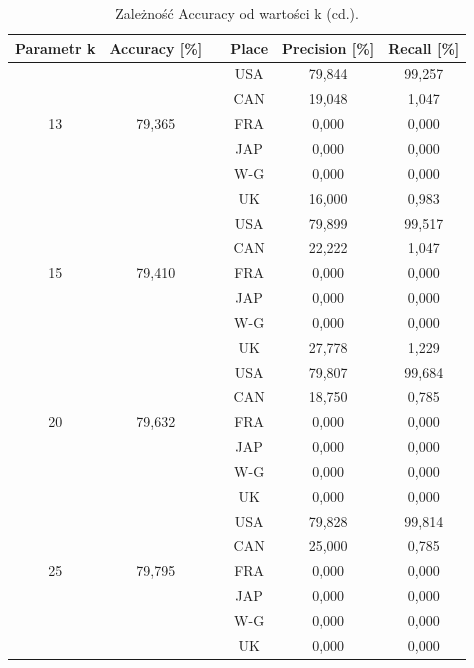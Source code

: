\documentclass{classrep}
\begin{document}
\begin{table}[h!]
	\centering
	\begin{tabular} {c c c c c c}
		\hline
		\textbf{Parametr k} & \textbf{Accuracy [\%]} & \vline & \textbf{Place} & \textbf{Precision [\%]} & \textbf{Recall [\%]}\\ [0.5ex] 
		\hline	
		\hline 
		&   		&\vline& USA & 79,844 & 99,257 \\
		&			&\vline& CAN & 19,048 & 1,047 \\
		13 & 79,365 &\vline& FRA & 0,000 & 0,000 \\
		&			&\vline& JAP & 0,000 & 0,000 \\
		&			&\vline& W-G & 0,000 & 0,000 \\
		&			&\vline& UK  & 16,000 & 0,983 \\
		\hline 
		&   		&\vline& USA & 79,899 & 99,517 \\
		&			&\vline& CAN & 22,222 & 1,047 \\
		15 & 79,410	&\vline& FRA & 0,000 & 0,000 \\
		&			&\vline& JAP & 0,000 & 0,000 \\
		&			&\vline& W-G & 0,000 & 0,000 \\
		&			&\vline& UK  & 27,778 & 1,229 \\
		\hline 
		&   		&\vline& USA & 79,807 & 99,684 \\
		&			&\vline& CAN & 18,750 & 0,785 \\
		20 & 79,632 &\vline& FRA & 0,000 & 0,000 \\
		&			&\vline& JAP & 0,000 & 0,000 \\
		&			&\vline& W-G & 0,000 & 0,000 \\
		&			&\vline& UK  & 0,000 & 0,000 \\
		\hline 
		&   		&\vline& USA & 79,828 & 99,814 \\
		&			&\vline& CAN & 25,000 & 0,785 \\
		25 & 79,795 &\vline& FRA & 0,000 & 0,000 \\
		&			&\vline& JAP & 0,000 & 0,000 \\
		&			&\vline& W-G & 0,000 & 0,000 \\
		&			&\vline& UK  & 0,000 & 0,000 \\
		\hline
		\hline
\end{tabular}
\caption{Zależność Accuracy od wartości k (cd.). }
\label{tabelaK2}
\end{table}
\end{document}
